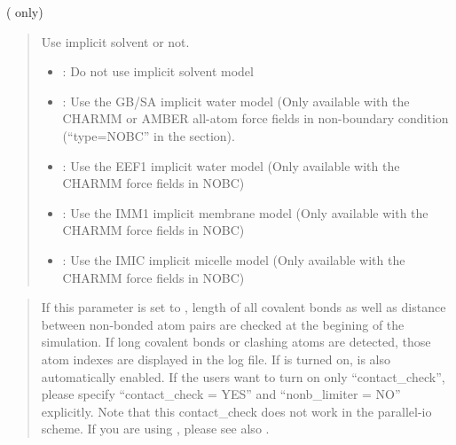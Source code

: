 \documentclass[a4paper,11pt,oneside,english]{sphinxmanual}
\begin{document}
  ( only)
\begin{quote}


Use implicit solvent or not.
\begin{itemize}
\item {} 
: Do not use implicit solvent model

\item {} 
: Use the GB/SA implicit water model (Only available with the CHARMM or AMBER all-atom force fields in non-boundary condition (“type=NOBC” in the \sphinxstylestrong{{[}BOUNDARY{]}} section).  

\item {} 
: Use the EEF1 implicit water model (Only available with the CHARMM force fields in NOBC) 

\item {} 
: Use the IMM1 implicit membrane model (Only available with the CHARMM force fields in NOBC) 

\item {} 
: Use the IMIC implicit micelle model (Only available with the CHARMM force fields in NOBC) 

\end{itemize}
\end{quote}

 
\begin{quote}


If this parameter is set to , length of all covalent bonds
as well as distance between non-bonded atom pairs are checked at the begining of the simulation.
If long covalent bonds or clashing atoms are detected, those atom indexes are displayed in the log file.
If  is turned on,  is also automatically enabled.
If the users want to turn on only “contact\_check”,
please specify “contact\_check = YES” and “nonb\_limiter = NO” explicitly.
Note that this contact\_check does not work in the parallel-io scheme.
If you are using , please see also .
\end{quote}
\end{document}
